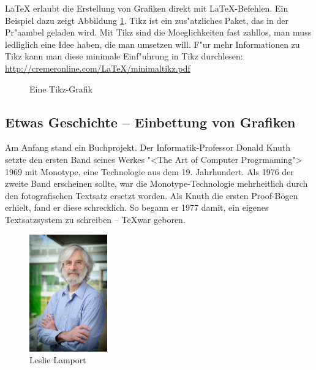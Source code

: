 \documentclass[11pt, a4paper]{article}
\newcommand{\ltx}{\LaTeX}
\begin{document}
\ltx{} erlaubt die Erstellung von Grafiken direkt mit \ltx-Befehlen. Ein Beispiel dazu zeigt Abbildung \ref{fig:tikz}. Tikz ist ein zus"atzliches Paket, das in der Pr"aambel geladen wird.
Mit Tikz sind die Moeglichkeiten fast zahllos, man muss ledliglich eine Idee haben, die man umsetzen will. F"ur mehr Informationen zu Tikz kann man diese minimale Einf"uhrung in Tikz durchlesen:
\url{http://cremeronline.com/LaTeX/minimaltikz.pdf}
%
\begin{figure}[t]
\centering
{}
\caption{Eine Tikz-Grafik\label{fig:tikz}}
\end{figure}


\subsection{Etwas Geschichte -- Einbettung von Grafiken}
Am Anfang stand ein Buchprojekt. Der Informatik-Professor Donald Knuth setzte den ersten Band seines Werkes "<The Art of Computer Progrmaming"> 1969 mit Monotype, eine Technologie aus dem 19. Jahrhundert. Als 1976 der zweite Band erscheinen sollte, war die Monotype-Technologie mehrheitlich durch den fotografischen Textsatz ersetzt worden. Als Knuth die ersten Proof-Bögen erhielt, fand er diese schrecklich. So begann er 1977 damit, ein eigenes Textsatzsystem zu schreiben -- \TeX war geboren.

\begin{figure}[htb]
\centering
\includegraphics[width=0.3\textwidth]{Leslie_Lamportd}
\caption{Leslie Lamport\label{fig:LL}}
\end{figure}
\end{document}
